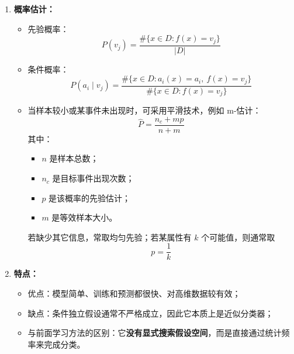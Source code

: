 \documentclass[../main.tex]{subfiles}
\begin{document}
\begin{enumerate}
    \item \textbf{概率估计：}
    \begin{itemize}
        \item 先验概率：
        $$
        P(v_j)=\frac{\#\{x\in D:f(x)=v_j\}}{|D|}
        $$
        \item 条件概率：
        $$
        P(a_i\mid v_j)=\frac{\#\{x\in D:a_i(x)=a_i,\ f(x)=v_j\}}{\#\{x\in D:f(x)=v_j\}}
        $$
        \item 当样本较小或某事件未出现时，可采用平滑技术，例如 m-估计：
        $$
        \hat{P}=\frac{n_c+mp}{n+m}
        $$
        其中：
        \begin{itemize}
            \item $n$ 是样本总数；
            \item $n_c$ 是目标事件出现次数；
            \item $p$ 是该概率的先验估计；
            \item $m$ 是等效样本大小。
        \end{itemize}
        若缺少其它信息，常取均匀先验；若某属性有 $k$ 个可能值，则通常取
        $$
        p=\frac{1}{k}
        $$
    \end{itemize}

    \item \textbf{特点：}
    \begin{itemize}
        \item 优点：模型简单、训练和预测都很快、对高维数据较有效；
        \item 缺点：条件独立假设通常不严格成立，因此它本质上是近似分类器；
        \item 与前面学习方法的区别：它\textbf{没有显式搜索假设空间}，而是直接通过统计频率来完成分类。
    \end{itemize}
\end{enumerate}
\end{document}
